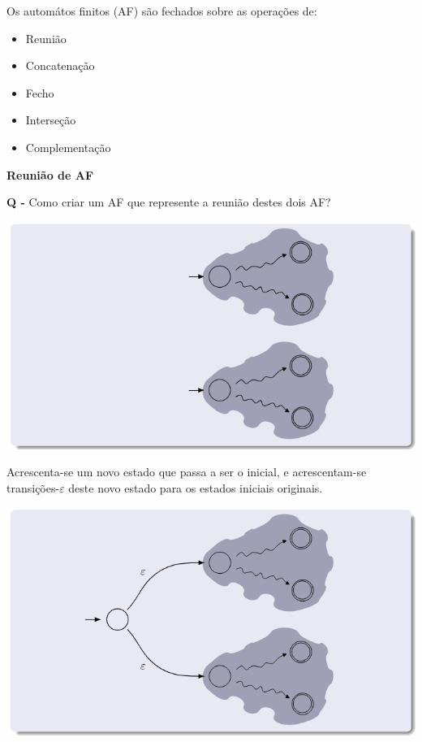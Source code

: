 \documentclass{article}
\begin{document}
\begin{flushleft}
  Os automátos finitos (AF) são fechados sobre as operações de:
  \begin{itemize}
    \item Reunião
    \item Concatenação
    \item Fecho
    \item Interseção
    \item Complementação
  \end{itemize}\vspace{5mm}

  \textbf{Reunião de AF}\break

  \begin{center}
    \textbf{Q -} Como criar um AF que represente a reunião destes dois AF?

    \includegraphics[scale=0.4]{58}
  \end{center}

  \pagebreak

  \begin{center}
    Acrescenta-se um novo estado que passa a ser o inicial, e acrescentam-se transições-$\varepsilon$
    deste novo estado para os estados iniciais originais.

    \includegraphics[scale=0.4]{59}
  \end{center}


\end{flushleft}
\end{document}
